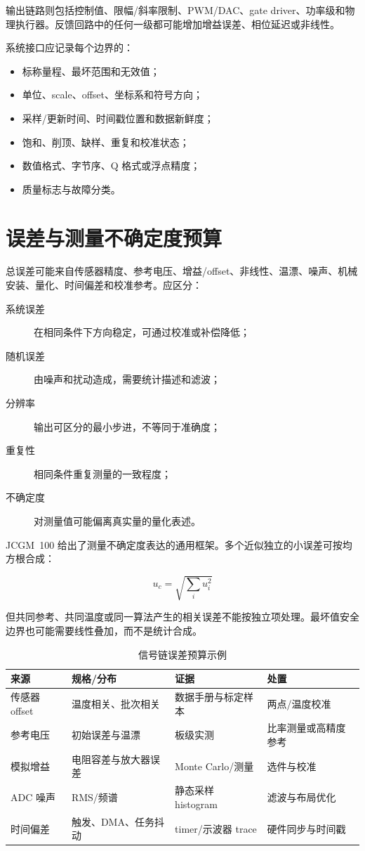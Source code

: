 输出链路则包括控制值、限幅/斜率限制、PWM/DAC、gate driver、功率级和物理执行器。反馈回路中的任何一级都可能增加增益误差、相位延迟或非线性。

系统接口应记录每个边界的：

\begin{itemize}
  \item 标称量程、最坏范围和无效值；
  \item 单位、scale、offset、坐标系和符号方向；
  \item 采样/更新时间、时间戳位置和数据新鲜度；
  \item 饱和、削顶、缺样、重复和校准状态；
  \item 数值格式、字节序、Q 格式或浮点精度；
  \item 质量标志与故障分类。
\end{itemize}

\section{误差与测量不确定度预算}

总误差可能来自传感器精度、参考电压、增益/offset、非线性、温漂、噪声、机械安装、量化、时间偏差和校准参考。应区分：

\begin{description}
  \item[系统误差] 在相同条件下方向稳定，可通过校准或补偿降低；
  \item[随机误差] 由噪声和扰动造成，需要统计描述和滤波；
  \item[分辨率] 输出可区分的最小步进，不等同于准确度；
  \item[重复性] 相同条件重复测量的一致程度；
  \item[不确定度] 对测量值可能偏离真实量的量化表述。
\end{description}

JCGM~100 给出了测量不确定度表达的通用框架\cite{jcgm100}。多个近似独立的小误差可按均方根合成：

\begin{equation}
  u_c=\sqrt{\sum_i u_i^2}
\end{equation}

但共同参考、共同温度或同一算法产生的相关误差不能按独立项处理。最坏值安全边界也可能需要线性叠加，而不是统计合成。

\begin{table}[H]
  \centering
  \caption{信号链误差预算示例}
  \begin{tabular}{p{31mm}p{31mm}p{37mm}p{38mm}}
    \hline
    来源 & 规格/分布 & 证据 & 处置 \\
    \hline
    传感器 offset & 温度相关、批次相关 & 数据手册与标定样本 & 两点/温度校准 \\
    参考电压 & 初始误差与温漂 & 板级实测 & 比率测量或高精度参考 \\
    模拟增益 & 电阻容差与放大器误差 & Monte Carlo/测量 & 选件与校准 \\
    ADC 噪声 & RMS/频谱 & 静态采样 histogram & 滤波与布局优化 \\
    时间偏差 & 触发、DMA、任务抖动 & timer/示波器 trace & 硬件同步与时间戳 \\
    \hline
  \end{tabular}
\end{table}

